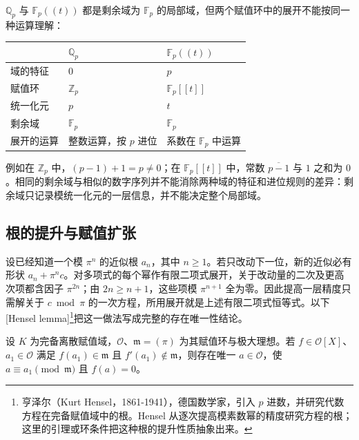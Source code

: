 \ProseParagraphBreak
\begin{samepage}
	\(\mathbb Q_p\) 与 \(\mathbb F_p(\!(t)\!)\) 都是剩余域为 \(\mathbb F_p\) 的局部域，但两个赋值环中的展开不能按同一种运算理解：
	\begin{center}
		\begin{tabular}{@{}lll@{}}
			\toprule
			& \(\mathbb Q_p\) & \(\mathbb F_p(\!(t)\!)\) \\
			\midrule
			域的特征 & \(0\) & \(p\) \\
			赋值环 & \(\mathbb Z_p\) & \(\mathbb F_p[\![t]\!]\) \\
			统一化元 & \(p\) & \(t\) \\
			剩余域 & \(\mathbb F_p\) & \(\mathbb F_p\) \\
			展开的运算 & 整数运算，按 \(p\) 进位 & 系数在 \(\mathbb F_p\) 中运算 \\
			\bottomrule
		\end{tabular}
	\end{center}
\end{samepage}
例如在 \(\mathbb Z_p\) 中，\((p-1)+1=p\neq0\)；在 \(\mathbb F_p[\![t]\!]\) 中，常数 \(\overline{p-1}\) 与 \(1\) 之和为 \(0\)。相同的剩余域与相似的数字序列并不能消除两种域的特征和进位规则的差异：剩余域只记录模统一化元的一层信息，并不能决定整个局部域。

\subsection{根的提升与赋值扩张}
\label{b1:subsec:D01:03}

设已经知道一个模 \(\pi^n\) 的近似根 \(a_n\)，其中 \(n\geq1\)。若只改动下一位，新的近似必有形状 \(a_n+\pi^nc\)。对多项式的每个幂作有限二项式展开，关于改动量的二次及更高次项都含因子 \(\pi^{2n}\)；由 \(2n\geq n+1\)，这些项模 \(\pi^{n+1}\) 全为零。因此提高一层精度只需解关于 \(c\bmod\pi\) 的一次方程，所用展开就是上述有限二项式恒等式。以下[Hensel lemma]\footnote{亨泽尔（Kurt Hensel，1861-1941），德国数学家，引入 \(p\) 进数，并研究代数方程在完备赋值域中的根。Hensel 从逐次提高模素数幂的精度研究方程的根；这里的引理或环条件把这种根的提升性质抽象出来。}把这一做法写成完整的存在唯一性结论。
\begin{theorem}\label{b1:thm:hensel-simple}
	设 \(K\) 为完备离散赋值域，\(\mathcal O\)、\(\mathfrak m=(\pi)\) 为其赋值环与极大理想。若 \(f\in\mathcal O[X]\)、\(a_1\in\mathcal O\) 满足 \(f(a_1)\in\mathfrak m\) 且 \(f'(a_1)\notin\mathfrak m\)，则存在唯一 \(a\in\mathcal O\)，使 \(a\equiv a_1\pmod{\mathfrak m}\) 且 \(f(a)=0\)。
\end{theorem}

